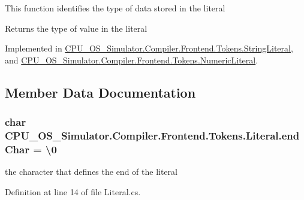 This function identifies the type of data stored in the literal 

\begin{DoxyReturn}{Returns}
the type of value in the literal
\end{DoxyReturn}


Implemented in \hyperlink{class_c_p_u___o_s___simulator_1_1_compiler_1_1_frontend_1_1_tokens_1_1_string_literal_ad4121c2eda9ab84f08bb0c51996c96cb}{C\+P\+U\+\_\+\+O\+S\+\_\+\+Simulator.\+Compiler.\+Frontend.\+Tokens.\+String\+Literal}, and \hyperlink{class_c_p_u___o_s___simulator_1_1_compiler_1_1_frontend_1_1_tokens_1_1_numeric_literal_ac00d8a0002a5a291fba5713d385d11a6}{C\+P\+U\+\_\+\+O\+S\+\_\+\+Simulator.\+Compiler.\+Frontend.\+Tokens.\+Numeric\+Literal}.



\subsection{Member Data Documentation}
\hypertarget{class_c_p_u___o_s___simulator_1_1_compiler_1_1_frontend_1_1_tokens_1_1_literal_ab07076b3a3eaae7e88f664904aaa341f}{}
\subsubsection[{end\+Char}]{\setlength{\rightskip}{0pt plus 5cm}char C\+P\+U\+\_\+\+O\+S\+\_\+\+Simulator.\+Compiler.\+Frontend.\+Tokens.\+Literal.\+end\+Char = \textquotesingle{}\textbackslash{}0\textquotesingle{}\hspace{0.3cm}{\ttfamily [protected]}}\label{class_c_p_u___o_s___simulator_1_1_compiler_1_1_frontend_1_1_tokens_1_1_literal_ab07076b3a3eaae7e88f664904aaa341f}


the character that defines the end of the literal 



Definition at line 14 of file Literal.\+cs.

\hypertarget{class_c_p_u___o_s___simulator_1_1_compiler_1_1_frontend_1_1_tokens_1_1_literal_ae93e9ee8a14f8f8fed07f5e9a8232b5a}{}
